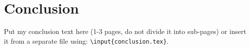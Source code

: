 \chapter*{Conclusion \TODO} %

Put my conclusion text here (1-3 pages, do not divide it into sub-pages) or insert it from a separate file using: \texttt{\textbackslash input\{conclusion.tex\}}.